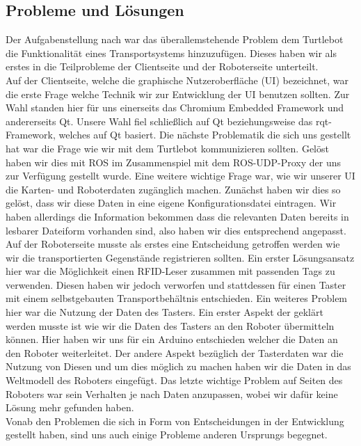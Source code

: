 \documentclass[a4paper,12pt,headsepline]{scrartcl}
\begin{document}
	\subsection{Probleme und Lösungen}
Der Aufgabenstellung nach war das überallemstehende Problem dem Turtlebot die Funktionalität eines Transportsystems hinzuzufügen. Dieses haben wir als erstes in die Teilprobleme der Clientseite und der Roboterseite unterteilt.\\
Auf der Clientseite, welche die graphische Nutzeroberfläche (UI) bezeichnet, war die erste Frage welche Technik wir zur Entwicklung der UI benutzen sollten. Zur Wahl standen hier für uns einerseits das Chromium Embedded Framework und andererseits Qt. Unsere Wahl fiel schließlich auf Qt beziehungsweise das rqt-Framework, welches auf Qt basiert. Die nächste Problematik die sich uns gestellt hat war die Frage wie wir mit dem Turtlebot kommunizieren sollten. Gelöst haben wir dies mit ROS im Zusammenspiel mit dem ROS-UDP-Proxy der uns zur Verfügung gestellt wurde. Eine weitere wichtige Frage war, wie wir unserer UI die Karten- und Roboterdaten zugänglich machen. Zunächst haben wir dies so gelöst, dass wir diese Daten in eine eigene Konfigurationsdatei eintragen. Wir haben allerdings die Information bekommen dass die relevanten Daten bereits in lesbarer Dateiform vorhanden sind, also haben wir dies entsprechend angepasst.\\
Auf der Roboterseite musste als erstes eine Entscheidung getroffen werden wie wir die transportierten Gegenstände registrieren sollten. Ein erster Lösungsansatz hier war die Möglichkeit einen RFID-Leser zusammen mit passenden Tags zu verwenden. Diesen haben wir jedoch verworfen und stattdessen für einen Taster mit einem selbstgebauten Transportbehältnis entschieden. Ein weiteres Problem hier war die Nutzung der Daten des Tasters. Ein erster Aspekt der geklärt werden musste ist wie wir die Daten des Tasters an den Roboter übermitteln können. Hier haben wir uns für ein Arduino entschieden welcher die Daten an den Roboter weiterleitet. Der andere Aspekt bezüglich der Tasterdaten war die Nutzung von Diesen und um dies möglich zu machen haben wir die Daten in das Weltmodell des Roboters eingefügt. Das letzte wichtige Problem auf Seiten des Roboters war sein Verhalten je nach Daten anzupassen, wobei wir dafür keine Lösung mehr gefunden haben.\\
Vonab den Problemen die sich in Form von Entscheidungen in der Entwicklung gestellt haben, sind uns auch einige Probleme anderen Ursprungs begegnet.\\
\end{document}
